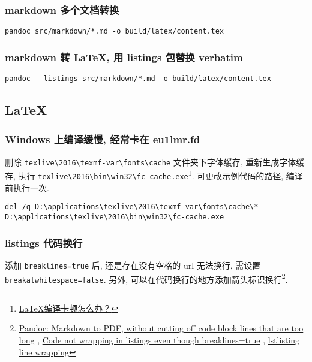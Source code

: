 \subsubsection{markdown
多个文档转换}\label{markdown-ux591aux4e2aux6587ux6863ux8f6cux6362}

\begin{lstlisting}
pandoc src/markdown/*.md -o build/latex/content.tex
\end{lstlisting}

\subsubsection{markdown 转 LaTeX, 用 listings 包替换
verbatim}\label{markdown-ux8f6c-latex-ux7528-listings-ux5305ux66ffux6362-verbatim}

\begin{lstlisting}
pandoc --listings src/markdown/*.md -o build/latex/content.tex
\end{lstlisting}

\subsection{LaTeX}\label{latex}

\subsubsection{Windows 上编译缓慢, 经常卡在
eu1lmr.fd}\label{windows-ux4e0aux7f16ux8bd1ux7f13ux6162-ux7ecfux5e38ux5361ux5728-eu1lmr.fd}

删除 \lstinline!texlive\2016\texmf-var\fonts\cache! 文件夹下字体缓存,
重新生成字体缓存, 执行
\lstinline!texlive\2016\bin\win32\fc-cache.exe!\footnote{\href{https://www.zhihu.com/question/51999238/answer/135852542}{LaTeX编译卡顿怎么办？}}.
可更改示例代码的路径, 编译前执行一次.

\begin{lstlisting}
del /q D:\applications\texlive\2016\texmf-var\fonts\cache\*
D:\applications\texlive\2016\bin\win32\fc-cache.exe
\end{lstlisting}

\subsubsection{listings
代码换行}\label{listings-ux4ee3ux7801ux6362ux884c}

添加 \lstinline!breaklines=true! 后, 还是存在没有空格的 url 无法换行,
需设置 \lstinline!breakatwhitespace=false!. 另外,
可以在代码换行的地方添加箭头标识换行\footnote{\href{http://tex.stackexchange.com/questions/179926/pandoc-markdown-to-pdf-without-cutting-off-code-block-lines-that-are-too-long}{Pandoc:
  Markdown to PDF, without cutting off code block lines that are too
  long} ,
  \href{http://tex.stackexchange.com/questions/174569/code-not-wrapping-in-listings-even-though-breaklines-true}{Code
  not wrapping in listings even though breaklines=true} ,
  \href{http://tex.stackexchange.com/questions/116534/lstlisting-line-wrapping}{lstlisting
  line wrapping}}.

